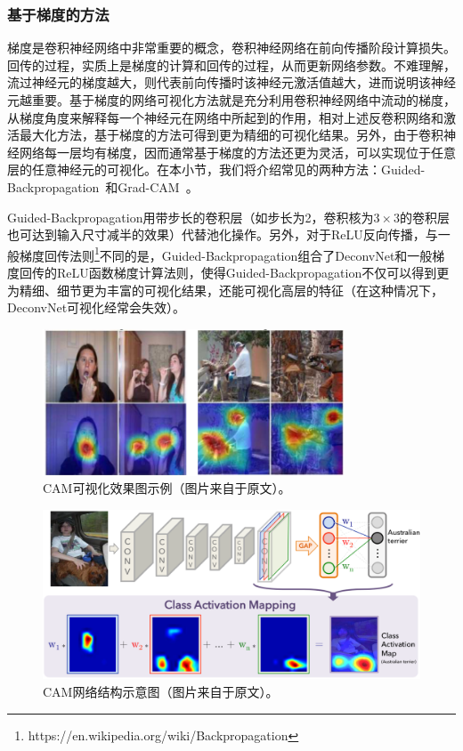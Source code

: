 \subsubsection{基于梯度的方法}
梯度是卷积神经网络中非常重要的概念，卷积神经网络在前向传播阶段计算损失。回传的过程，实质上是梯度的计算和回传的过程，从而更新网络参数。不难理解，流过神经元的梯度越大，则代表前向传播时该神经元激活值越大，进而说明该神经元越重要。基于梯度的网络可视化方法就是充分利用卷积神经网络中流动的梯度，从梯度角度来解释每一个神经元在网络中所起到的作用，相对上述反卷积网络和激活最大化方法，基于梯度的方法可得到更为精细的可视化结果。另外，由于卷积神经网络每一层均有梯度，因而通常基于梯度的方法还更为灵活，可以实现位于任意层的任意神经元的可视化。在本小节，我们将介绍常见的两种方法：Guided-Backpropagation~\cite{springenberg2014striving}和Grad-CAM~\cite{selvaraju2017grad}。

Guided-Backpropagation用带步长的卷积层（如步长为2，卷积核为$3\times 3$的卷积层也可达到输入尺寸减半的效果）代替池化操作。另外，对于ReLU反向传播，与一般梯度回传法则\footnote{https://en.wikipedia.org/wiki/Backpropagation}不同的是，Guided-Backpropagation组合了DeconvNet和一般梯度回传的ReLU函数梯度计算法则，使得Guided-Backpropagation不仅可以得到更为精细、细节更为丰富的可视化结果，还能可视化高层的特征（在这种情况下，DeconvNet可视化经常会失效）。
\begin{figure}[h]
	\centering
	\includegraphics[width=0.8\textwidth]{figure/cam_example}
	\caption{CAM可视化效果图示例（图片来自于原文）。}
	\label{fig:cam_example}
\end{figure}
\begin{figure}[h]
	\centering
	\includegraphics[width=1.0\textwidth]{figure/cam_arichitecture}
	\caption{CAM网络结构示意图（图片来自于原文）。}
	\label{fig:cam_arichitecture}
\end{figure}

